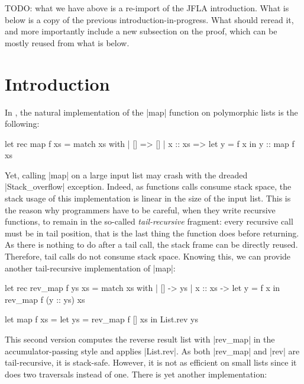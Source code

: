 TODO: what we have above is a re-import of the JFLA introduction.
What is below is a copy of the previous introduction-in-progress.
What should reread it, and more importantly include a new subsection on the proof,
which can be mostly reused from what is below.

\section{Introduction}

In \OCaml, the natural implementation of the \ocaml|map| function on polymorphic lists is the following:

\begin{Ocaml}
let rec map f xs =
  match xs with
  | [] =>
      []
  | x :: xs =>
      let y = f x in
      y :: map f xs
\end{Ocaml}

Yet, calling \ocaml|map| on a large input list may crash with the dreaded \ocaml|Stack_overflow| exception.
%
Indeed, as functions calls consume stack space, the stack usage of this implementation is linear in the size of the input list.
%
This is the reason why \OCaml programmers have to be careful, when they write recursive functions, to remain in the so-called \emph{tail-recursive} fragment: every recursive call must be in tail position, that is the last thing the function does before returning.
%
As there is nothing to do after a tail call, the stack frame can be directly reused.
%
Therefore, tail calls do not consume stack space.
%
Knowing this, we can provide another tail-recursive implementation of \ocaml|map|:

\begin{minipage}{0.5\linewidth}
\begin{Ocaml}
let rec rev_map f ys xs =
  match xs with
  | [] ->
      ys
  | x :: xs ->
      let y = f x in
      rev_map f (y :: ys) xs
\end{Ocaml}
\end{minipage}
\hfill
\begin{minipage}{0.5\linewidth}
\begin{Ocaml}
let map f xs =
  let ys = rev_map f [] xs in
  List.rev ys
\end{Ocaml}
\end{minipage}

This second version computes the reverse result list with \ocaml|rev_map| in the accumulator-passing style and applies \ocaml|List.rev|.
%
As both \ocaml|rev_map| and \ocaml|rev| are tail-recursive, it is stack-safe.
%
However, it is not as efficient on small lists since it does two traversals instead of one.
%
There is yet another implementation:

